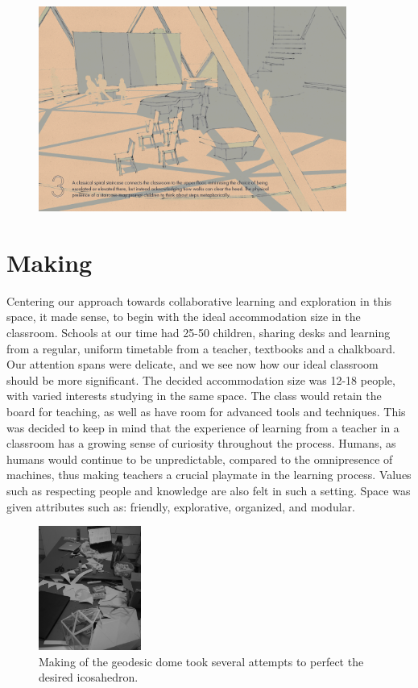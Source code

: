 \documentclass[a4paper,7pt]{article}
\begin{document}
\begin{figure}[h]
  \center
  \includegraphics[width=0.9\textwidth]{discoverdrome_3.png}
\end{figure}

\section{Making}
Centering our approach towards collaborative learning and exploration in this space, it made sense, to begin with the ideal accommodation size in the classroom. Schools at our time had 25-50 children, sharing desks and learning from a regular, uniform timetable from a teacher, textbooks and a chalkboard. Our attention spans were delicate, and we see now how our ideal classroom should be more significant. The decided accommodation size was 12-18 people, with varied interests studying in the same space. The class would retain the board for teaching, as well as have room for advanced tools and techniques. This was decided to keep in mind that the experience of learning from a teacher in a classroom has a growing sense of curiosity throughout the process. Humans, as humans would continue to be unpredictable, compared to the omnipresence of machines, thus making teachers a crucial playmate in the learning process. Values such as respecting people and knowledge are also felt in such a setting. Space was given attributes such as: friendly, explorative, organized, and modular.

\begin{figure}[h]
  \center
  \includegraphics[width=0.3\textwidth]{making.jpg}
  \caption{Making of the geodesic dome took several attempts to perfect the desired icosahedron.}
\end{figure}
\end{document}
